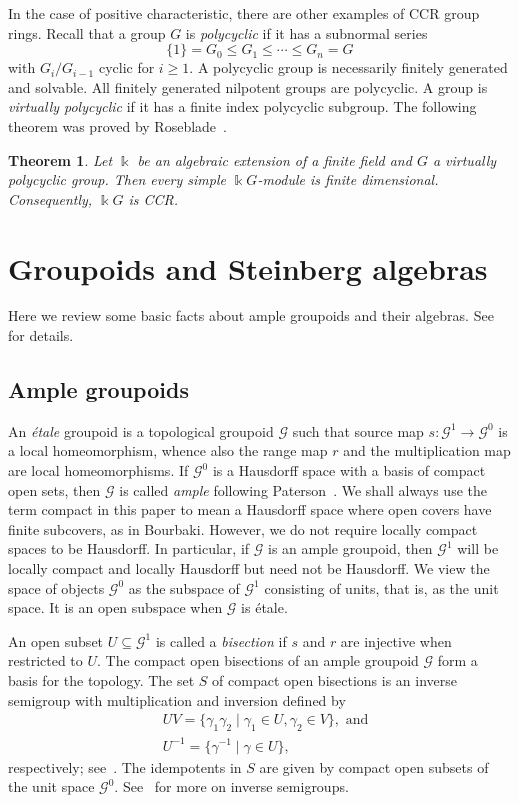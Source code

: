 \documentclass[11pt,reqno]{amsart}
\newtheorem{thm}{Theorem}[section]
\theoremstyle{plain}
\numberwithin{equation}{section}
\newcommand{\G}[0]{\mathscr{G}}
\begin{document}
In the case of positive characteristic, there are other examples of CCR group rings.  Recall that a group $G$ is \emph{polycyclic} if it has a subnormal series
\[\{1\}=G_0\leq G_1\leq \cdots \leq G_n=G\] with $G_i/G_{i-1}$ cyclic for $i\geq 1$.  A polycyclic group is necessarily finitely generated and solvable.  All finitely generated nilpotent groups are polycyclic.  A group is \emph{virtually polycyclic} if it has a finite index polycyclic subgroup.  The following theorem was proved by Roseblade~\cite{roseblade}.

\begin{thm} \label{t:Rosebade}
Let $\Bbbk$ be an algebraic extension of a finite field and $G$ a virtually polycyclic group.  Then every simple $\Bbbk G$-module is finite dimensional.  Consequently, $\Bbbk G$ is CCR.
\end{thm}

\section{Groupoids and Steinberg algebras} \label{sec:steinbergalgs}
Here we review some basic facts about ample groupoids and their algebras.  See~\cite{CFST14,St10} for details.

\subsection{Ample groupoids}
An \emph{\'etale} groupoid is a topological groupoid $\mathscr G$ such that source map $s\colon \mathscr G^1\to \mathscr G^0$ is a local homeomorphism, whence also the range map $r$ and the multiplication map are local homeomorphisms.  If $\mathscr G^0$ is a Hausdorff space with a basis of compact open sets, then $\mathscr G$ is called \emph{ample} following Paterson~\cite{Pa99}.  We shall always use the term compact in this paper to mean a Hausdorff space where open covers have finite subcovers, as in Bourbaki.  However, we do not require locally compact spaces to be Hausdorff.  In particular, if $\mathscr G$ is an ample groupoid, then $\mathscr G^1$ will be locally compact and locally Hausdorff but need not be Hausdorff.  We view the space of objects $\mathscr G^0$ as the subspace of $\mathscr G^1$ consisting of units, that is, as the unit space.  It is an open subspace when $\mathscr G$ is \'etale.

An open subset $U\subseteq \mathscr G^1$ is called a \emph{bisection} if $s$ and $r$ are injective when restricted to $U$.  The compact open bisections of an ample groupoid $\mathscr G$ form a basis for the topology.  The set $S$ of compact open bisections is an inverse semigroup with multiplication and inversion defined by
\begin{align*}
& U V= \{\gamma_1\gamma_2\mid \gamma_1\in U, \gamma_2\in V\}, \text{ and} \\
& U^{-1}=\{\gamma^{-1}\mid \gamma\in U\},
\end{align*}
respectively; see~\cite{Pa99}. The idempotents in $S$ are given by compact open subsets of the unit space $\G^0$. See~\cite{Lawson} for more on inverse semigroups.
\end{document}
